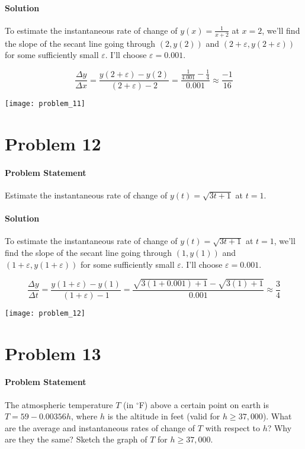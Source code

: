 \documentclass{article}
\begin{document}
  \paragraph{Solution} To estimate the instantaneous rate of change of \(y(x) = \frac{1}{x+2}\) at \(x=2\), we'll find the slope of the secant line going through \((2, y(2)) \) and \( (2 + \varepsilon, y(2 + \varepsilon)) \) for some sufficiently small \(\varepsilon\). I'll choose \(\varepsilon = 0.001\).

  \begin{equation}
    \frac{\Delta{y}}{\Delta{x}} = \frac{y(2+\varepsilon)-y(2)}{(2+\varepsilon) - 2} = \frac{\frac{1}{4.001} - \frac{1}{4}}{0.001} \approx \boxed{\frac{-1}{16}}
  \end{equation}

  \texttt{[image: problem\_11]}
  \newpage

  \section{Problem 12}
  \paragraph{Problem Statement} Estimate the instantaneous rate of change of \(y(t) = \sqrt{3t + 1}\) at \(t=1\).

  \paragraph{Solution} To estimate the instantaneous rate of change of \(y(t) = \sqrt{3t + 1}\) at \(t=1\), we'll find the slope of the secant line going through \((1, y(1)) \) and \( (1 + \varepsilon, y(1 + \varepsilon)) \) for some sufficiently small \(\varepsilon\). I'll choose \(\varepsilon = 0.001\).

  \begin{equation}
    \frac{\Delta{y}}{\Delta{t}} = \frac{y(1+\varepsilon)-y(1)}{(1+\varepsilon) - 1} = \frac{\sqrt{3(1+0.001) + 1} - \sqrt{3(1) + 1}}{0.001} \approx \boxed{\frac{3}{4}}
  \end{equation}

  \texttt{[image: problem\_12]}
  \newpage

  \section{Problem 13}
  \paragraph{Problem Statement} The atmospheric temperature \(T\) (in \(^\circ\)F) above a certain point on earth is \(T=59-0.00356h\), where \(h\) is the altitude in feet (valid for \(h \ge 37,000\)). What are the average and instantaneous rates of change of \(T\) with respect to \(h\)? Why are they the same? Sketch the graph of \(T\) for \(h \ge 37,000\).
\end{document}

